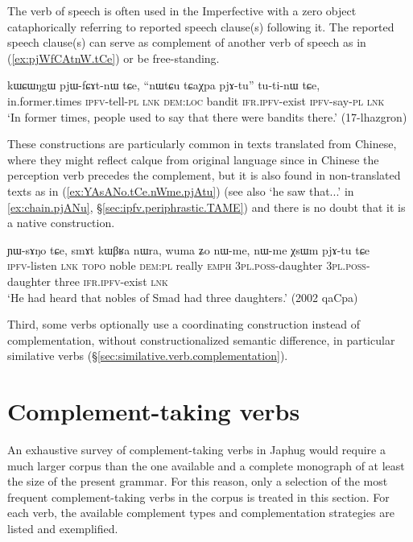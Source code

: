 The verb of speech  is often used in the Imperfective with a zero object cataphorically referring to reported speech clause(s) following it. The reported speech clause(s) can serve as complement of another verb of speech as in (\ref{ex:pjWfCAtnW.tCe}) or be free-standing.

\begin{exe}
	\ex \label{ex:pjWfCAtnW.tCe}
	\gll kɯɕɯŋgɯ pjɯ-fɕɤt-nɯ tɕe, ``nɯtɕu tɕaχpa pjɤ-tu'' tu-ti-nɯ tɕe,  \\
	in.former.times \textsc{ipfv}-tell-\textsc{pl} \textsc{lnk} \textsc{dem}:\textsc{loc} bandit \textsc{ifr}.\textsc{ipfv}-exist \textsc{ipfv}-say-\textsc{pl} \textsc{lnk} \\
	\glt `In former times, people used to say that there were bandits there.' (17-lhazgron)
\end{exe}

These constructions are particularly common in texts translated from Chinese, where they might reflect calque from original language since in Chinese the perception verb precedes the complement, but it is also found in non-translated texts as in (\ref{ex:YAsANo.tCe.nWme.pjAtu}) (see also  `he saw that...' in  \ref{ex:chain.pjANu}, §\ref{sec:ipfv.periphrastic.TAME}) and there is no doubt that it is a native construction.

\begin{exe}
	\ex \label{ex:YAsANo.tCe.nWme.pjAtu}
	\gll ɲɯ-sɤŋo tɕe, smɤt kɯβʁa nɯra, wuma ʑo nɯ-me, nɯ-me χsɯm pjɤ-tu tɕe \\
	\textsc{ipfv}-listen \textsc{lnk}  \textsc{topo} noble \textsc{dem}:\textsc{pl} really \textsc{emph} \textsc{3pl}.\textsc{poss}-daughter  \textsc{3pl}.\textsc{poss}-daughter  three \textsc{ifr}.\textsc{ipfv}-exist \textsc{lnk} \\
	\glt `He had heard that nobles of Smad had three daughters.' (2002 qaCpa) 
\end{exe}

Third, some verbs optionally use a coordinating construction instead of complementation, without constructionalized semantic difference, in particular similative verbs (§\ref{sec:similative.verb.complementation}).


\section{Complement-taking verbs} \label{sec:complement.taking.verbs}

An exhaustive survey of com\-ple\-ment-taking verbs in Japhug would require a much larger corpus than the one available and a complete monograph of at least the size of the present grammar. For this reason, only a selection of the most frequent com\-ple\-ment-taking verbs in the corpus is treated in this section. For each verb, the available complement types and complementation strategies are listed and exemplified.

